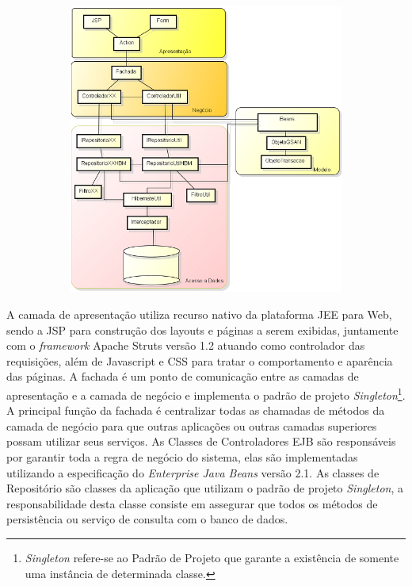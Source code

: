 \begin{figure}[H]
	\centering
	\caption{\textbf{Arquitetura Detalhada do Sistema GSAN}}	
	\label{figura:arquiteturaDetalhada}
	\begin{subfigure}[H]{\textwidth}
		\centering
		\includegraphics{figuras/gsanArquiteturaMenor.png}
	\end{subfigure}
\end{figure}

	
A camada de apresentação utiliza recurso nativo da plataforma JEE para Web, sendo a JSP para construção dos layouts e páginas a serem exibidas, juntamente com o \textit{framework} Apache Struts versão 1.2 atuando como controlador das requisições, além de Javascript e CSS para tratar o comportamento e aparência das páginas.
A fachada é um ponto de comunicação entre as camadas de apresentação e a camada de negócio e implementa o padrão de projeto \textit{Singleton}\footnote{\textit{Singleton} refere-se ao Padrão de Projeto que garante a existência de somente uma instância de determinada classe.}. 
A principal função da fachada é centralizar todas as chamadas de métodos da camada de negócio para que outras aplicações ou outras camadas superiores possam utilizar seus serviços.
As Classes de Controladores EJB são responsáveis por garantir toda a regra de negócio do sistema, elas são implementadas utilizando a especificação do \textit{Enterprise Java Beans} versão 2.1.
As classes de Repositório são classes da aplicação que utilizam o padrão de projeto \textit{Singleton}, a responsabilidade desta classe consiste em assegurar que todos os métodos de persistência ou serviço de consulta com o banco de dados.

